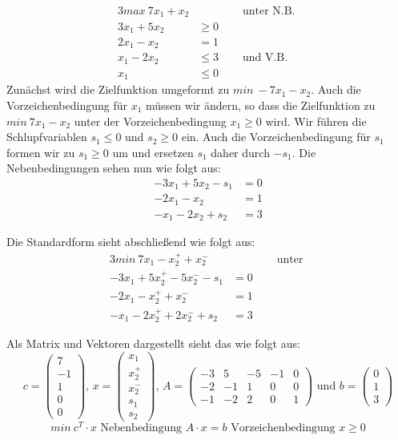 \begin{Bsp}
  \begin{alignat*}{3}
    max~7x_1 + x_2 & &\quad\text{ unter N.B. }\\
    3 x_1 + 5 x_2 &\ge 0\\
    2 x_1 - x_2 &= 1 \\
    x_1 - 2 x_2 &\le 3 &\quad\text{ und V.B.}\\
    x_1 &\le 0
  \end{alignat*}
  Zunächst wird die Zielfunktion umgeformt zu $min~-7 x_1 - x_2$. Auch die Vorzeichenbedingung für $x_1$ müssen wir ändern, so dass die Zielfunktion zu $min~7 x_1 - x_2$ unter der Vorzeichenbedingung $x_1 \ge 0$ wird. Wir führen die Schlupfvariablen $s_1 \le 0$ und $s_2 \ge 0$ ein. Auch die Vorzeichenbedingung für $s_1$ formen wir zu $s_1 \ge 0$ um und ersetzen $s_1$ daher durch $-s_1$. Die Nebenbedingungen sehen nun wie folgt aus:
  \begin{align*}
    -3 x_1 + 5 x_2 - s_1 &= 0 \\
    -2 x_1 - x_2 &= 1 \\
    -x_1 - 2 x_2 + s_2 &= 3
  \end{align*}
  
  Die Standardform sieht abschließend wie folgt aus:
  \begin{alignat*}{3}
    min~7x_1 - x_2^+ + x_2^- & & \quad \text{ unter }\\
    -3x_1 + 5 x_2^+ - 5 x_2^- -s_1 &= 0 \\
    -2 x_1 - x_2^+ + x_2^- &= 1 \\
    -x_1 - 2x_2^+ + 2x_2^- + s_2 &= 3
    \end{alignat*}
    
  Als Matrix und Vektoren dargestellt sieht das wie folgt aus:
  \[ c = \begin{pmatrix}7 \\ -1 \\ 1 \\ 0 \\ 0\end{pmatrix} \text{, } x = \begin{pmatrix}x_1 \\ x_2^+ \\ x_2^- \\ s_1 \\ s_2 \end{pmatrix} \text{, } A = \begin{pmatrix} -3 & 5 & -5 & -1 & 0 \\ -2 & -1 & 1 & 0 & 0\\ -1 & -2 & 2 & 0 & 1\end{pmatrix} \text{ und }b = \begin{pmatrix} 0 \\ 1 \\ 3\end{pmatrix} \]
  \[ min~c^T \cdot x \text{ Nebenbedingung }A \cdot x = b \text{ Vorzeichenbedingung } x \ge 0\]
\end{Bsp}

